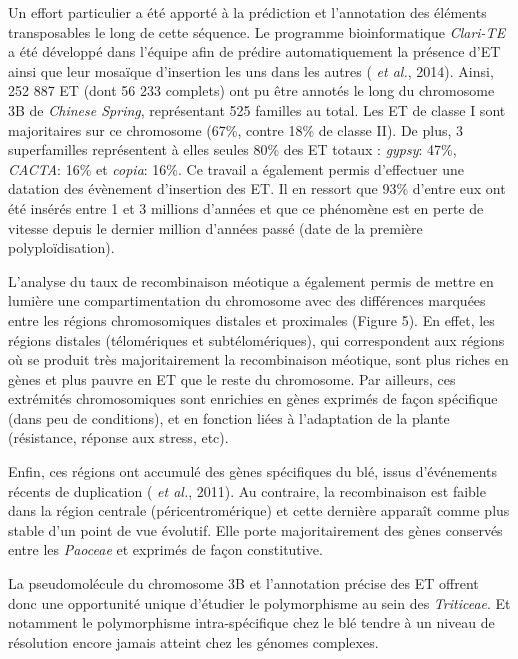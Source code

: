 \documentclass[a4paper, 12pt]{article}
\begin{document}
\begin{onehalfspace}
Un effort particulier a été apporté à la prédiction et l'annotation des éléments transposables le long de cette séquence. Le programme bioinformatique \textit{Clari-TE} a été développé dans l'équipe afin de prédire automatiquement la présence d'ET ainsi que leur mosaïque d'insertion les uns dans les autres ( \textit{et al.}, 2014). Ainsi, 252 887 ET (dont 56 233 complets) ont pu être annotés le long du chromosome 3B de \textit{Chinese Spring}, représentant 525 familles au total. Les ET de classe I sont majoritaires sur ce chromosome (67\%, contre 18\% de classe II). De plus, 3 superfamilles représentent à elles seules 80\% des ET totaux : \textit{gypsy}: 47\%, \textit{CACTA}: 16\% et \textit{copia}: 16\%. Ce travail a également permis d'effectuer une datation des évènement d'insertion des ET. Il en ressort que 93\% d'entre eux ont été insérés entre 1 et 3 millions d'années et que ce phénomène est en perte de vitesse depuis le dernier million d'années passé (date de la première polyploïdisation).

L'analyse du taux de recombinaison méotique a également permis de mettre en lumière une compartimentation du chromosome avec des différences marquées entre les régions chromosomiques distales et proximales (Figure 5). En effet, les régions distales (télomériques et subtélomériques), qui correspondent aux régions où se produit très majoritairement la recombinaison méotique, sont plus riches en gènes et plus pauvre en ET que le reste du chromosome. Par ailleurs, ces extrémités chromosomiques sont enrichies en gènes exprimés de façon spécifique (dans peu de conditions), et en fonction liées à l'adaptation de la plante (résistance, réponse aux stress, etc). 

\newpage
\thispagestyle{empty}
\null
\addtocounter{page}{-1}
\newpage

Enfin, ces régions ont accumulé des gènes spécifiques du blé, issus d'événements récents de duplication ( \textit{et al.}, 2011). Au contraire, la recombinaison est faible dans la région centrale (péricentromérique) et cette dernière apparaît comme plus stable d'un point de vue évolutif. Elle porte majoritairement des gènes conservés entre les \textit{Paoceae} et exprimés de façon constitutive.

La pseudomolécule du chromosome 3B et l'annotation précise des ET offrent donc une opportunité unique d'étudier le polymorphisme au sein des \textit{Triticeae}. Et notamment le polymorphisme intra-spécifique chez le blé tendre à un niveau de résolution encore jamais atteint chez les génomes complexes.


\end{onehalfspace}
\end{document}
